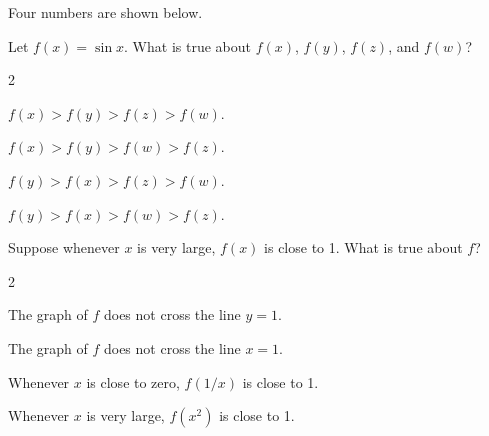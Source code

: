 \documentclass[12pt]{ximera}
\renewenvironment{multipleChoice}
{\begin{trivlist}\item[\hskip\labelsep\small\bfseries Choose the best answer:]
\hfil\begin{enumerate}\begin{multicols}{2}}
 {\end{multicols}\end{enumerate}\end{trivlist}}
\renewcommand{\choice}[2][]{\item \begin{minipage}[t]{2in}#2\end{minipage}\ifthenelse{\boolean{#1}}{\ifhandout \else  \fi}{}}
\begin{document}
\begin{minipage}{\textwidth}
\begin{problem}

  Four numbers are shown below.
  \begin{image}
  \end{image}
  Let $f(x) = \sin x$.  What is true about $f(x)$, $f(y)$, $f(z)$, and $f(w)$?
  \begin{multipleChoice}
    \choice{$f(x) > f(y) > f(z) > f(w)$.}
    \choice{$f(x) > f(y) > f(w) > f(z)$.}
    \choice[correct]{$f(y) > f(x) > f(z) > f(w)$.}
    \choice{$f(y) > f(x) > f(w) > f(z)$.}
  \end{multipleChoice}
\end{problem}
\end{minipage}

\vspace{6ex}

\begin{minipage}{\textwidth}
\begin{problem}

  Suppose whenever $x$ is very large, $f(x)$ is close to 1.  What is true about $f$?
  \begin{multipleChoice}
    \choice{The graph of $f$ does not cross the line $y = 1$.}
    \choice{The graph of $f$ does not cross the line $x = 1$.}
    \choice{Whenever $x$ is close to zero, $f(1/x)$ is close to 1.}
    \choice[correct]{Whenever $x$ is very large, $f(x^2)$ is close to 1.}
  \end{multipleChoice}
\end{problem}
\end{minipage}

\vspace{6ex}
\end{document}
